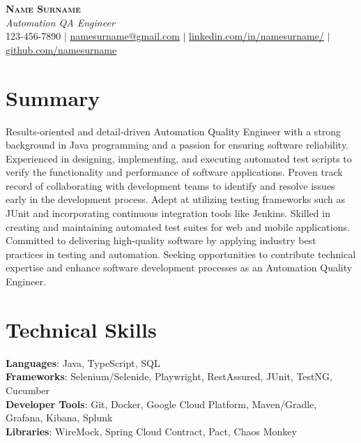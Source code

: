 \documentclass[letterpaper,11pt]{article}
\begin{document}

\begin{center}
    \textbf{\Huge \scshape Name Surname} \\ \vspace{1pt}
    \small \textit{Automation QA Engineer} \\
    123-456-7890 $|$ \href{mailto:namesurname@gmail.com}{\underline{namesurname@gmail.com}} $|$ 
    \href{https://www.linkedin.com/in/namesurname/}{\underline{linkedin.com/in/namesurname/}} $|$
    \href{https://github.com/namesurname}{\underline{github.com/namesurname}}
\end{center}

\section*{Summary}
Results-oriented and detail-driven Automation Quality Engineer with a strong background in Java programming and a passion for ensuring software reliability. Experienced in designing, implementing, and executing automated test scripts to verify the functionality and performance of software applications. Proven track record of collaborating with development teams to identify and resolve issues early in the development process. Adept at utilizing testing frameworks such as JUnit and incorporating continuous integration tools like Jenkins. Skilled in creating and maintaining automated test suites for web and mobile applications. Committed to delivering high-quality software by applying industry best practices in testing and automation. Seeking opportunities to contribute technical expertise and enhance software development processes as an Automation Quality Engineer.

\section{Technical Skills}
 \begin{itemize}[leftmargin=0.15in, label={}]
    \small{\item{
     \textbf{Languages}{: Java, TypeScript, SQL} \\
     \textbf{Frameworks}{: Selenium/Selenide, Playwright, RestAssured, JUnit, TestNG, Cucumber} \\
     \textbf{Developer Tools}{: Git, Docker, Google Cloud Platform, Maven/Gradle, Grafana, Kibana, Splunk} \\
     \textbf{Libraries}{: WireMock, Spring Cloud Contract, Pact, Chaos Monkey}
    }}
 \end{itemize}
\end{document}
